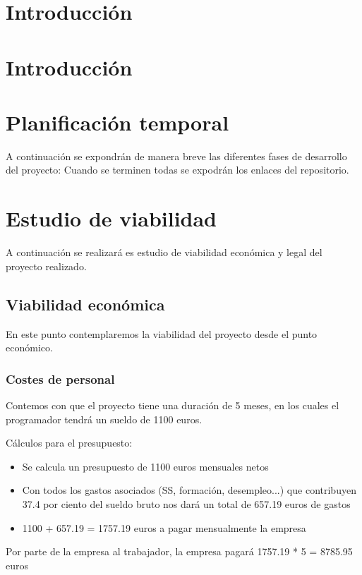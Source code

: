 
\section{Introducción}

\section{Introducción}

\section{Planificación temporal}
A continuación se expondrán de manera breve las diferentes fases de desarrollo del proyecto:
Cuando se terminen todas se expodrán los enlaces del repositorio.


\section{Estudio de viabilidad}
A continuación se realizará es estudio de viabilidad económica y legal del proyecto realizado.
\subsection{Viabilidad económica}
En este punto contemplaremos la viabilidad del proyecto desde el punto económico.
\subsubsection{Costes de personal}
Contemos con que el proyecto tiene una duración de 5 meses, en los cuales el programador tendrá un sueldo de 1100 euros.

Cálculos para el presupuesto:

\begin{itemize}
	\item Se calcula un presupuesto de 1100 euros mensuales netos
	\item Con todos los gastos asociados (SS, formación, desempleo...) que contribuyen 37.4 por ciento del sueldo bruto nos dará un total de 657.19 euros de gastos
	\item 1100 + 657.19 =  1757.19 euros a pagar mensualmente la empresa
\end{itemize}

Por parte de la empresa al trabajador, la empresa pagará 1757.19 * 5 = 8785.95 euros



